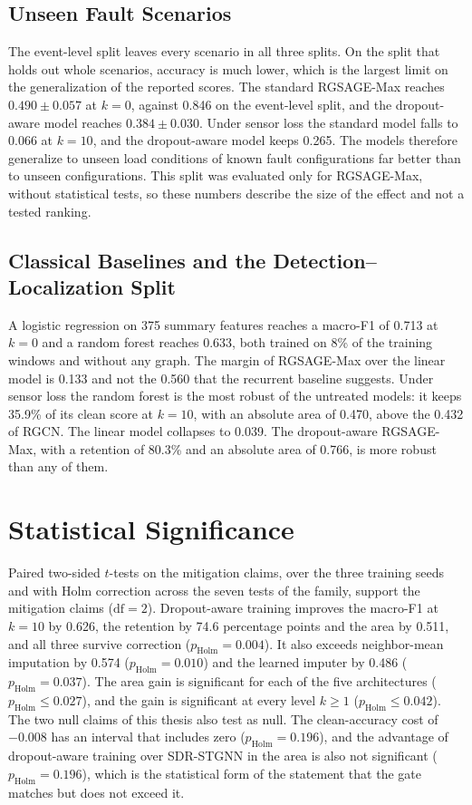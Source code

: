 \documentclass[MTech]{ugthesis}
\begin{document}
\subsection{Unseen Fault Scenarios}

The event-level split leaves every scenario in all three splits. On the split that holds out whole scenarios, accuracy is much lower, which is the largest limit on the generalization of the reported scores. The standard RGSAGE-Max reaches $0.490\pm0.057$ at $k=0$, against 0.846 on the event-level split, and the dropout-aware model reaches $0.384\pm0.030$. Under sensor loss the standard model falls to 0.066 at $k=10$, and the dropout-aware model keeps 0.265. The models therefore generalize to unseen load conditions of known fault configurations far better than to unseen configurations. This split was evaluated only for RGSAGE-Max, without statistical tests, so these numbers describe the size of the effect and not a tested ranking.

\subsection{Classical Baselines and the Detection--Localization Split}

A logistic regression on 375 summary features reaches a macro-F1 of 0.713 at $k=0$ and a random forest reaches 0.633, both trained on 8\% of the training windows and without any graph. The margin of RGSAGE-Max over the linear model is 0.133 and not the 0.560 that the recurrent baseline suggests. Under sensor loss the random forest is the most robust of the untreated models: it keeps 35.9\% of its clean score at $k=10$, with an absolute area of 0.470, above the 0.432 of RGCN. The linear model collapses to 0.039. The dropout-aware RGSAGE-Max, with a retention of 80.3\% and an absolute area of 0.766, is more robust than any of them.

\section{Statistical Significance}

Paired two-sided $t$-tests on the mitigation claims, over the three training seeds and with Holm correction across the seven tests of the family, support the mitigation claims ($\mathrm{df}=2$). Dropout-aware training improves the macro-F1 at $k=10$ by 0.626, the retention by 74.6 percentage points and the area by 0.511, and all three survive correction ($p_{\mathrm{Holm}}=0.004$). It also exceeds neighbor-mean imputation by 0.574 ($p_{\mathrm{Holm}}=0.010$) and the learned imputer by 0.486 ($p_{\mathrm{Holm}}=0.037$). The area gain is significant for each of the five architectures ($p_{\mathrm{Holm}}\le0.027$), and the gain is significant at every level $k\ge1$ ($p_{\mathrm{Holm}}\le0.042$). The two null claims of this thesis also test as null. The clean-accuracy cost of $-0.008$ has an interval that includes zero ($p_{\mathrm{Holm}}=0.196$), and the advantage of dropout-aware training over \ac{SDR-STGNN} in the area is also not significant ($p_{\mathrm{Holm}}=0.196$), which is the statistical form of the statement that the gate matches but does not exceed it.
\end{document}
